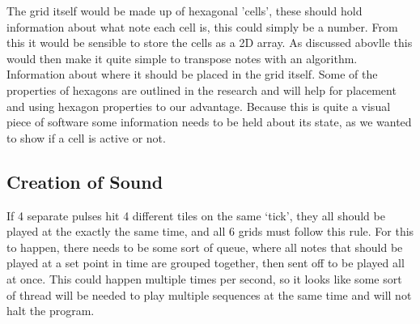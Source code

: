 \documentclass[10pt,a4paper]{article}
\begin{document}
\noindent
The grid itself would be made up of hexagonal 'cells’, these should hold information about what note each cell is, this could simply be a number. From this it would be sensible to store the cells as a 2D array. As discussed abovlle this would then make it quite simple to transpose notes with an algorithm. Information about where it should be placed in the grid itself. Some of the properties of hexagons are outlined in the research and will help for placement and using hexagon properties to our advantage. Because this is quite a visual piece of software some information needs to be held about its state, as we wanted to show if a cell is active or not.

\subsection{Creation of Sound}
If 4 separate pulses hit 4 different tiles on the same ‘tick’, they all should be played at the exactly the same time, and all 6 grids must follow this rule. For this to happen, there needs to be some sort of queue, where all notes that should be played at a set point in time are grouped together, then sent off to be played all at once. This could happen multiple times per second, so it looks like some sort of thread will be needed to play multiple sequences at the same time and will not halt the program.
\end{document}
